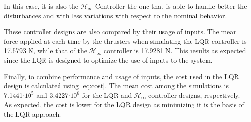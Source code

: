 In this case, it is also the $\mathcal{H}_\infty$ Controller the one that is able to handle better the disturbances and with less variations with respect to the nominal behavior.

These controller designs are also compared by their usage of inputs. The mean force applied at each time by the thrusters when simulating the LQR controller is \num{17.5793} N, while that of the $\mathcal{H}_\infty$ controller is \num{17.9281} N. This results as expected since the LQR is designed to optimize the use of inputs to the system.

Finally, to combine performance and usage of inputs, the cost used in the LQR design is calculated using \autoref{eq:cost}. The mean cost among the simulations is \num{7.1441}$\cdot 10^5$ and \num{3.4227}$\cdot 10^6$ for the LQR and $\mathcal{H}_\infty$ controller designs, respectively. As expected, the cost is lower for the LQR design as minimizing it is the basis of the LQR approach.



